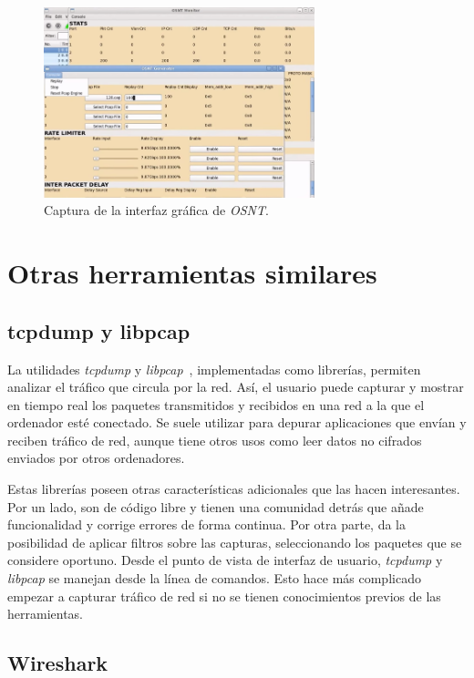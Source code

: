\begin{figure}[!htp]
  \centering
  \includegraphics[width=0.7\textwidth,clip=true]{graphics/capturas/osnt}
  \caption{Captura de la interfaz gráfica de \textit{OSNT}.}
  \label{fig:osnt}
\end{figure}

\section{Otras herramientas similares\label{sec:eda:otras}}

\subsection*{tcpdump y libpcap\label{sec:eda:tcpdump}}

La utilidades \textit{tcpdump} y \textit{libpcap}~\cite{tcpdump}, implementadas como librerías, permiten analizar el tráfico que circula por la red.
Así, el usuario puede capturar y mostrar en tiempo real los paquetes transmitidos y recibidos en una red a la que el ordenador esté conectado.
Se suele utilizar para depurar aplicaciones que envían y reciben tráfico de red, aunque tiene otros usos como leer datos no cifrados enviados por otros ordenadores.

Estas librerías poseen otras características adicionales que las hacen interesantes.
Por un lado, son de código libre y tienen una comunidad detrás que añade funcionalidad y corrige errores de forma continua.
Por otra parte, da la posibilidad de aplicar filtros sobre las capturas, seleccionando los paquetes que se considere oportuno.
Desde el punto de vista de interfaz de usuario, \textit{tcpdump} y \textit{libpcap} se manejan desde la línea de comandos.
Esto hace más complicado empezar a capturar tráfico de red si no se tienen conocimientos previos de las herramientas.

\subsection*{Wireshark\label{sec:eda:wireshark}}

